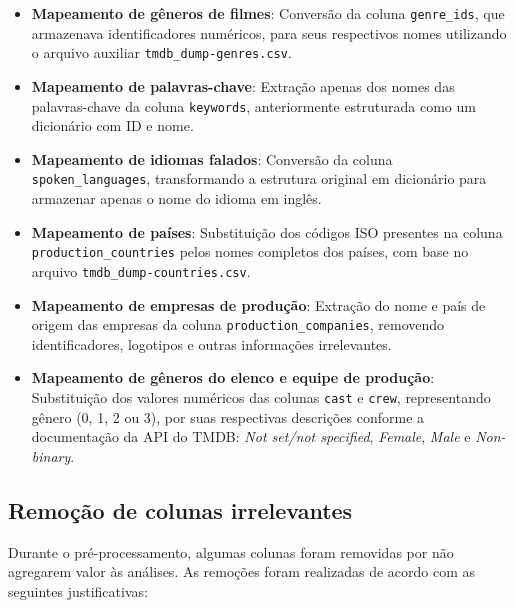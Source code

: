 \begin{itemize}
    \item \textbf{Mapeamento de gêneros de filmes}: Conversão da coluna \texttt{genre\_ids}, que armazenava identificadores numéricos, para seus respectivos nomes utilizando o arquivo auxiliar \texttt{tmdb\_dump-genres.csv}.
    \item \textbf{Mapeamento de palavras-chave}: Extração apenas dos nomes das palavras-chave da coluna \texttt{keywords}, anteriormente estruturada como um dicionário com ID e nome.
    \item \textbf{Mapeamento de idiomas falados}: Conversão da coluna \texttt{spoken\_languages}, transformando a estrutura original em dicionário para armazenar apenas o nome do idioma em inglês.
    \sloppy
    \item \textbf{Mapeamento de países}: Substituição dos códigos ISO presentes na coluna \texttt{production\_countries} pelos nomes completos dos países, com base no arquivo \texttt{tmdb\_dump-countries.csv}.
    \item \textbf{Mapeamento de empresas de produção}: Extração do nome e país de origem das empresas da coluna \texttt{production\_companies}, removendo identificadores, logotipos e outras informações irrelevantes.
    \item \textbf{Mapeamento de gêneros do elenco e equipe de produção}: Substituição dos valores numéricos das colunas \texttt{cast} e \texttt{crew}, representando gênero (0, 1, 2 ou 3), por suas respectivas descrições conforme a documentação da \acrshort{API} do \acrshort{TMDB}: \textit{Not set/not specified}, \textit{Female}, \textit{Male} e \textit{Non-binary}.
\end{itemize}

\subsection{Remoção de colunas irrelevantes}
Durante o pré-processamento, algumas colunas foram removidas por não agregarem valor às análises. As remoções foram realizadas de acordo com as seguintes justificativas:

